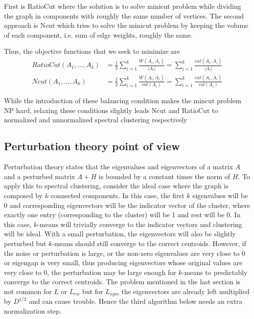 \documentclass[10pt,a4paper, nocenter]{report}
\begin{document}
        First is RatioCut \cite{hagen-kahng-1992} where the solution is to solve minicut problem while dividing the graph in components with roughly the same number of vertices. The second approach is Ncut \cite{Shi-Malik-maxcut-00} which tries to solve the minicut problem by keeping the volume of each component, i.e. sum of edge weights, roughly the same.
        
        Thus, the objective functions that we seek to minimize are
        \begin{align*}
            RatioCut(A_{1},\dots,A_{k}) &= \frac{1}{2} \sum_{i=1}^{k}\frac{W(A_{i},\bar{A}_{i})}{\lvert A_{i} \rvert}
            = \sum_{i=1}^{k}\frac{cut(A_{i},\bar{A}_{i})}{\lvert A_{i} \rvert} \\
            Ncut(A_{1},\dots,A_{k}) &= \frac{1}{2}\sum_{i=1}^{k}\frac{W(A_{i},\bar{A}_{i})}{vol(A_{i})} = 
            \sum_{i=1}^{k}\frac{cut(A_{i},\bar{A}_{i})}{vol(A_{i})}
        \end{align*}
    
        While the introduction of these balancing condition makes the mincut problem NP hard, relaxing these conditions slightly leads Ncut and RatioCut to normalized and unnormalized spectral clustering respectively \cite{Luxburg2007}

    \subsection{Perturbation theory point of view}
        Perturbation theory states that the eigenvalues and eigenvectors of a matrix $A$ and a perturbed matrix $A+H$ is bounded by a constant times the norm of $H$. To apply this to spectral clustering, consider the ideal case where the graph is composed by $k$  connected components. In this case, the first $k$ eigenvalues will be 0 and corresponding eigenvectors will be the indicator vector of the cluster, where exactly one entry (corresponding to the cluster) will be 1 and rest will be 0. In this case, $k$-means will trivially converge to the indicator vectors and clustering will be ideal. With a small perturbation, the eigenvectors will also be slightly perturbed but $k$-means should still converge to the correct centroids. However, if the noise or perturbation is large, or the non-zero eigenvalues are very close to 0 or eigengap is very small, thus producing eigenvectors whose original values are very close to 0, the perturbation may be large enough for $k$-means to predictably converge to the correct centroids. The problem mentioned in the last section is not common for $L$ or $L_{rw}$ but for $L_{sym}$ the eigenvectors are already left multiplied by $D^{1/2}$ and can cause trouble. Hence the third algorithm below \cite{ng-jordan-01} needs an extra normalization step. 
\end{document}
